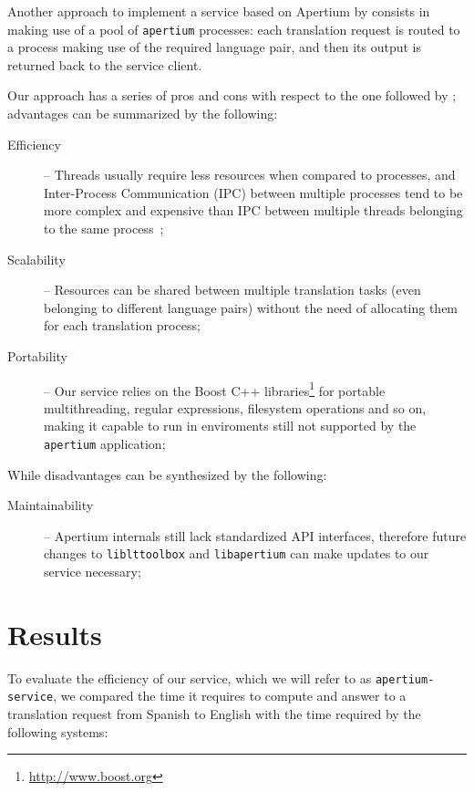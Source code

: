 \documentclass[11pt]{article}
\begin{document}
Another approach to implement a service based on Apertium by \cite{sanchez-cartagena2009scalable} consists in making use of a pool of {\tt\small apertium} processes: each translation request is routed to a process making use of the required language pair, and then its output is returned back to the service client.

Our approach has a series of pros and cons with respect to the one followed by \cite{sanchez-cartagena2009scalable}; advantages can be summarized by the following:

\begin{description}
 \item[Efficiency] -- Threads usually require less resources when compared to processes, and Inter-Process Communication (IPC) between multiple processes tend to be more complex and expensive than IPC between multiple threads belonging to the same process~\citep{tanenbaum};
 \item[Scalability] -- Resources can be shared between multiple translation tasks (even belonging to different language pairs) without the need of allocating them for each translation process;
 \item[Portability] -- Our service relies on the Boost C++ libraries\footnote{\small\url{http://www.boost.org}} for portable multithreading, regular expressions, filesystem operations and so on, making it capable to run in enviroments still not supported by the {\tt\small apertium} application;
\end{description}

While disadvantages can be synthesized by the following:

\begin{description}
 \item[Maintainability] -- Apertium internals still lack standardized API interfaces, therefore future changes to {\small\tt liblttoolbox} and {\small\tt libapertium} can make updates to our service necessary;
\end{description}


\section{Results}

To evaluate the efficiency of our service, which we will refer to as {\tt\small apertium-service}, we compared the time it requires to compute and answer to a translation request from Spanish to English with the time required by the following systems:
\end{document}
